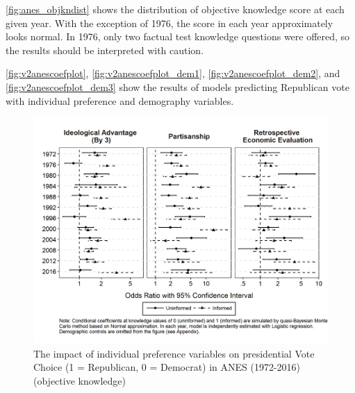 \noindent \autoref{fig:anes_objkndist} shows the distribution of objective knowledge score at each given year. With the exception of 1976, the score in each year approximately looks normal. In 1976, only two factual test knowledge questions were offered, so the results should be interpreted with caution.

\par \autoref{fig:v2anescoefplot}, \autoref{fig:v2anescoefplot_dem1}, \autoref{fig:v2anescoefplot_dem2}, and \autoref{fig:v2anescoefplot_dem3} show the results of models predicting Republican vote with individual preference and demography variables. 

\begin{figure}[ht!!!]
    \caption{The impact of individual preference variables on presidential Vote Choice (1 = Republican, 0 = Democrat) in ANES (1972-2016) (objective knowledge)}
    \label{fig:v2anescoefplot}
    \includegraphics[width=\linewidth]{../outputs/m2sq_anescoefplot.png}
\end{figure}

